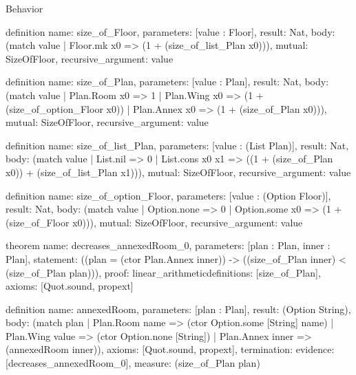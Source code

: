 \begin{lexlean}{Behavior}
\begin{semanticmodule}
definition{
  name: size_of_Floor,
  parameters: [value : Floor],
  result: Nat,
  body: (match value | Floor.mk x0 => (1 + (size_of_list_Plan x0))),
  mutual: SizeOfFloor,
  recursive_argument: value
}

definition{
  name: size_of_Plan,
  parameters: [value : Plan],
  result: Nat,
  body: (match value
    | Plan.Room x0 => 1
    | Plan.Wing x0 => (1 + (size_of_option_Floor x0))
    | Plan.Annex x0 => (1 + (size_of_Plan x0))),
  mutual: SizeOfFloor,
  recursive_argument: value
}

definition{
  name: size_of_list_Plan,
  parameters: [value : (List Plan)],
  result: Nat,
  body: (match value
    | List.nil => 0
    | List.cons x0 x1 => ((1 + (size_of_Plan x0)) + (size_of_list_Plan x1))),
  mutual: SizeOfFloor,
  recursive_argument: value
}

definition{
  name: size_of_option_Floor,
  parameters: [value : (Option Floor)],
  result: Nat,
  body: (match value | Option.none => 0 | Option.some x0 => (1 + (size_of_Floor x0))),
  mutual: SizeOfFloor,
  recursive_argument: value
}

theorem{
  name: decreases_annexedRoom_0,
  parameters: [plan : Plan, inner : Plan],
  statement: ((plan = (ctor Plan.Annex inner)) -> ((size_of_Plan inner) < (size_of_Plan plan))),
  proof: linear_arithmetic{definitions: [size_of_Plan]},
  axioms: [Quot.sound, propext]
}

definition{
  name: annexedRoom,
  parameters: [plan : Plan],
  result: (Option String),
  body: (match plan
    | Plan.Room name => (ctor Option.some [String] name)
    | Plan.Wing value => (ctor Option.none [String])
    | Plan.Annex inner => (annexedRoom inner)),
  axioms: [Quot.sound, propext],
  termination: {evidence: [decreases_annexedRoom_0], measure: (size_of_Plan plan)}
}
\end{semanticmodule}
\end{lexlean}

